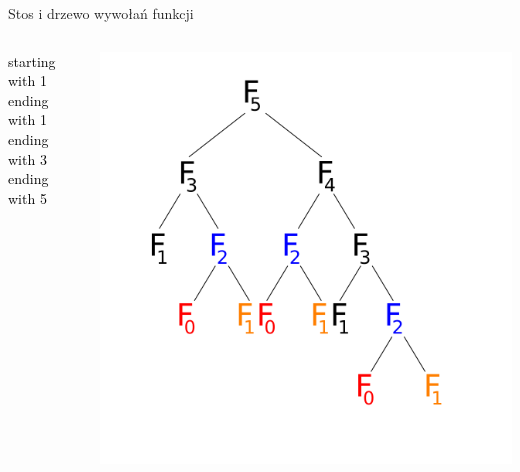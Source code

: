 \begin{frame}{Stos i drzewo wywołań funkcji}
\begin{columns}
\begin{column}{0.25\textwidth}
            \textcolor{black}{starting with 1}\\
            \textcolor{black}{ending with 1}\\
            \textcolor{black}{ending with 3}\\
            \textcolor{black}{ending with 5}\\
        \end{column}
        \begin{column}{0.5\textwidth}
            \includegraphics[width=\textwidth]{graphics/recursion/fibonacci_F3.png}
        \end{column}
    \end{columns}
\end{frame}
